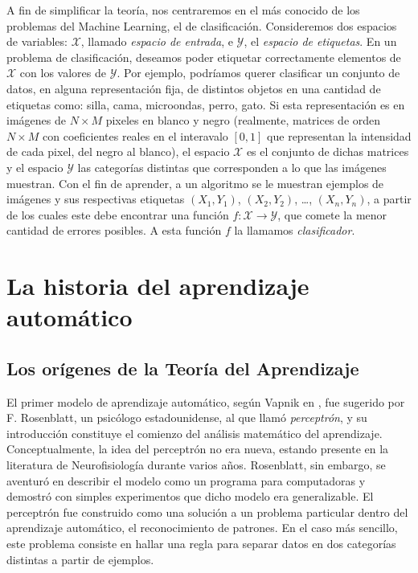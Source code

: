 \documentclass{report}
\begin{document}
A fin de simplificar la teoría, nos centraremos  en el más conocido de los problemas del Machine Learning, el de clasificación. Consideremos dos espacios
de variables: \(\mathcal{X}\), llamado \textit{espacio de entrada}, e \(\mathcal{Y}\), el  \textit{espacio de etiquetas}. En un problema de clasificación, deseamos poder etiquetar
correctamente elementos de \(\mathcal{X}\) con los valores de \(\mathcal{Y}\). Por ejemplo, podríamos querer clasificar un conjunto de datos, en alguna representación fija, de distintos
objetos en una cantidad de etiquetas como: silla, cama, microondas, perro, gato. Si esta representación es en imágenes de \(N\times M\) pixeles en blanco y negro (realmente,
matrices de orden \(N\times M\) con coeficientes reales en el interavalo \([0,1]\) que representan la intensidad de cada pixel, del negro al blanco), el espacio \(\mathcal{X}\) es
el conjunto de dichas matrices y el espacio \(\mathcal{Y}\) las categorías distintas que corresponden a lo que las imágenes muestran. Con el fin de aprender, a un algoritmo se le
muestran ejemplos de imágenes y sus respectivas etiquetas \((X_1,Y_1)\), \((X_2,Y_2)\), \dots, \((X_n,Y_n)\), a partir de los cuales este debe encontrar una función
\(f: \mathcal{X}\rightarrow \mathcal{Y}\), que comete la menor cantidad de errores posibles. A esta función \(f\) la llamamos \textit{clasificador}.

\section{La historia del aprendizaje automático}

\subsection{Los orígenes de la Teoría del Aprendizaje}

El primer modelo de aprendizaje automático, según Vapnik en \cite{vapnik1995}, fue sugerido por F. Rosenblatt, un psicólogo estadounidense, al que llamó \textit{perceptrón}, y su introducción constituye el comienzo del análisis matemático del aprendizaje. Conceptualmente, la idea del perceptrón no era nueva, estando presente en la literatura de Neurofisiología durante varios años. Rosenblatt, sin embargo, se aventuró en describir el modelo como un programa para computadoras y demostró con simples experimentos que dicho modelo era generalizable. El perceptrón fue construido como una solución a un problema particular dentro del aprendizaje automático, el reconocimiento de patrones. En el caso más sencillo, este problema consiste en hallar una regla para separar datos en dos categorías distintas a partir de ejemplos.
\end{document}
